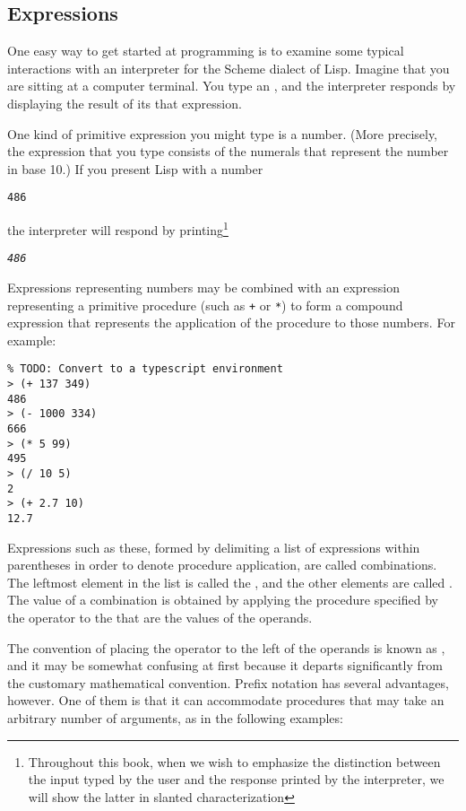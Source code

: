 \subsection{Expressions}
\label{sec:1.1.1}

One easy way to get started at programming is to examine some typical
interactions with an interpreter for the Scheme dialect of Lisp.
Imagine that you are sitting at a computer terminal.  You type an
, and the interpreter responds by displaying the result of
its  that expression.

One kind of primitive expression you might type is a number.  (More
precisely, the expression that you type consists of the numerals that
represent the number in base 10.)  If you present Lisp with
a number

\texttt{486}

\noindent
the interpreter will respond by printing\footnote{Throughout this
  book, when we wish to emphasize the distinction between the input
  typed by the user and the response printed by the interpreter, we
  will show the latter in slanted characterization}\relax

\texttt{\textit{486}}

\noindent Expressions representing numbers may be combined with an
expression representing a primitive procedure (such as \texttt{+} or
\texttt{*}) to form a compound expression that represents the
application of the procedure to those numbers.  For example:

\begin{verbatim}
% TODO: Convert to a typescript environment
> (+ 137 349)
486
> (- 1000 334)
666
> (* 5 99)
495
> (/ 10 5)
2
> (+ 2.7 10)
12.7
\end{verbatim}

Expressions such as these, formed by delimiting a list of expressions
within parentheses in order to denote procedure application, are
called combinations.  The leftmost element in the list is called the
, and the other elements are called .
The value of a combination is obtained by applying the procedure
specified by the operator to the  that are the values of the
operands.

The convention of placing the operator to the left of the operands is
known as , and it may be somewhat confusing at
first because it departs significantly from the customary mathematical
convention.  Prefix notation has several advantages, however.  One of
them is that it can accommodate procedures that may take an arbitrary
number of arguments, as in the following examples:

